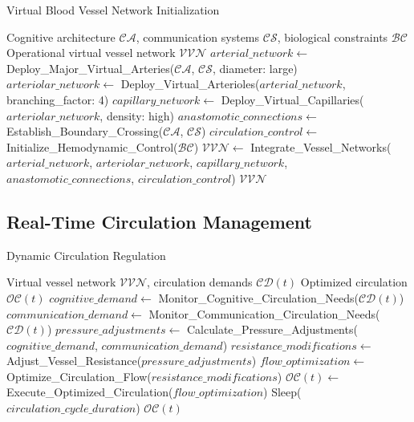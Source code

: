 \documentclass[12pt,a4paper]{article}
\begin{document}
\begin{algorithm}
\caption{Virtual Blood Vessel Network Initialization}
\begin{algorithmic}[1]
\REQUIRE Cognitive architecture $\mathcal{CA}$, communication systems $\mathcal{CS}$, biological constraints $\mathcal{BC}$
\ENSURE Operational virtual vessel network $\mathcal{VVN}$
\STATE $arterial\_network \leftarrow$ Deploy\_Major\_Virtual\_Arteries($\mathcal{CA}$, $\mathcal{CS}$, diameter: large)
\STATE $arteriolar\_network \leftarrow$ Deploy\_Virtual\_Arterioles($arterial\_network$, branching\_factor: 4)
\STATE $capillary\_network \leftarrow$ Deploy\_Virtual\_Capillaries($arteriolar\_network$, density: high)
\STATE $anastomotic\_connections \leftarrow$ Establish\_Boundary\_Crossing($\mathcal{CA}$, $\mathcal{CS}$)
\STATE $circulation\_control \leftarrow$ Initialize\_Hemodynamic\_Control($\mathcal{BC}$)
\STATE $\mathcal{VVN} \leftarrow$ Integrate\_Vessel\_Networks($arterial\_network$, $arteriolar\_network$, $capillary\_network$, $anastomotic\_connections$, $circulation\_control$)
\RETURN $\mathcal{VVN}$
\end{algorithmic}
\end{algorithm}

\subsection{Real-Time Circulation Management}

\begin{algorithm}
\caption{Dynamic Circulation Regulation}
\begin{algorithmic}[1]
\REQUIRE Virtual vessel network $\mathcal{VVN}$, circulation demands $\mathcal{CD}(t)$
\ENSURE Optimized circulation $\mathcal{OC}(t)$
    \STATE $cognitive\_demand \leftarrow$ Monitor\_Cognitive\_Circulation\_Needs($\mathcal{CD}(t)$)
    \STATE $communication\_demand \leftarrow$ Monitor\_Communication\_Circulation\_Needs($\mathcal{CD}(t)$)
    \STATE $pressure\_adjustments \leftarrow$ Calculate\_Pressure\_Adjustments($cognitive\_demand$, $communication\_demand$)
    \STATE $resistance\_modifications \leftarrow$ Adjust\_Vessel\_Resistance($pressure\_adjustments$)
    \STATE $flow\_optimization \leftarrow$ Optimize\_Circulation\_Flow($resistance\_modifications$)
    \STATE $\mathcal{OC}(t) \leftarrow$ Execute\_Optimized\_Circulation($flow\_optimization$)
    \STATE Sleep($circulation\_cycle\_duration$)
\ENDWHILE
\RETURN $\mathcal{OC}(t)$
\end{algorithmic}
\end{algorithm}
\end{document}
